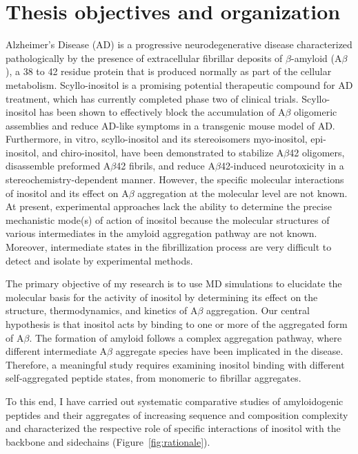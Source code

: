 \section{Thesis objectives and organization}
Alzheimer's Disease (AD) is a progressive neurodegenerative disease characterized pathologically by the presence of extracellular fibrillar deposits of $\beta$-amyloid (A$\beta$), a 38 to 42 residue protein that is produced normally as part of the cellular metabolism. Scyllo-inositol is a promising potential therapeutic compound for AD treatment, which has currently completed phase two of clinical trials. Scyllo-inositol has been shown to effectively block the accumulation of A$\beta$ oligomeric assemblies and reduce AD-like symptoms in a transgenic mouse model of AD. Furthermore, in vitro, scyllo-inositol and its stereoisomers myo-inositol, epi-inositol, and chiro-inositol, have been demonstrated to stabilize A$\beta$42 oligomers, disassemble preformed A$\beta$42 fibrils, and reduce A$\beta$42-induced neurotoxicity in a stereochemistry-dependent manner. However, the specific molecular interactions of inositol and its effect on A$\beta$ aggregation at the molecular level are not known. At present, experimental approaches lack the ability to determine the precise mechanistic mode(s) of action of inositol because the molecular structures of various intermediates in the amyloid aggregation pathway are not known. Moreover,  intermediate states in the fibrillization process are very difficult to detect and isolate by experimental methods.

The primary objective of my research is to use MD simulations to elucidate the molecular basis for the activity of inositol by determining its effect on the structure, thermodynamics, and kinetics of A$\beta$ aggregation.  Our central hypothesis is that inositol acts by binding to one or more of the aggregated form of A$\beta$.  The formation of amyloid follows a complex aggregation pathway, where different intermediate A$\beta$ aggregate species have been implicated in the disease. Therefore, a meaningful study requires examining inositol binding with different self-aggregated peptide states, from monomeric to fibrillar aggregates. 

To this end, I have carried out systematic comparative studies of amyloidogenic peptides and their aggregates of increasing sequence and composition complexity and characterized the respective role of specific interactions of inositol with the backbone and sidechains (Figure~\ref{fig:rationale}).

